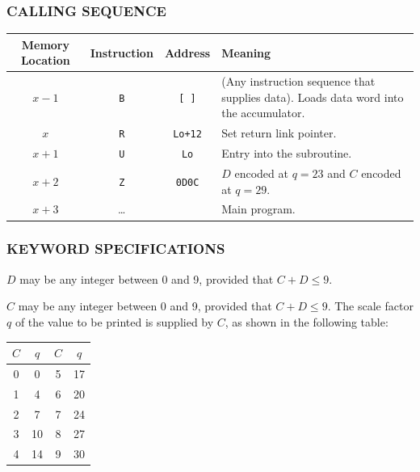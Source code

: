 \subsubsection*{CALLING SEQUENCE}
\begin{table}[h!]
\centering
\begin{tabularx}{\textwidth}{cccX}
\toprule
\textbf{Memory Location} & \textbf{Instruction} & \textbf{Address} & \textbf{Meaning} \\
\midrule
$x-1$             & \texttt{B}      & \texttt{[ ]}     & (Any instruction sequence that supplies data). Loads data word into the accumulator. \\
$x$               & \texttt{R}      & \texttt{Lo+12}   & Set return link pointer. \\
$x+1$             & \texttt{U}      & \texttt{Lo}      & Entry into the subroutine. \\
$x+2$             & \texttt{Z}      & \texttt{0D0C}    & $D$ encoded at $q=23$ and $C$ encoded at $q=29$. \\
$x+3$             & \dots           &                  & Main program. \\
\bottomrule
\end{tabularx}
\end{table}

\subsubsection*{KEYWORD SPECIFICATIONS}
$D$ may be any integer between 0 and 9, provided that $C + D \le 9$.

$C$ may be any integer between 0 and 9, provided that $C + D \le 9$. The scale factor $q$ of the value to be printed is supplied by $C$, as shown in the following table:

\begin{center}
\begin{tabular}{cc|cc}
    \toprule
    \textbf{$C$} & \textbf{$q$} & \textbf{$C$} & \textbf{$q$} \\
    \midrule
    0            & 0            & 5            & 17           \\
    1            & 4            & 6            & 20           \\
    2            & 7            & 7            & 24           \\
    3            & 10           & 8            & 27           \\
    4            & 14           & 9            & 30           \\
    \bottomrule
\end{tabular}
\end{center}

